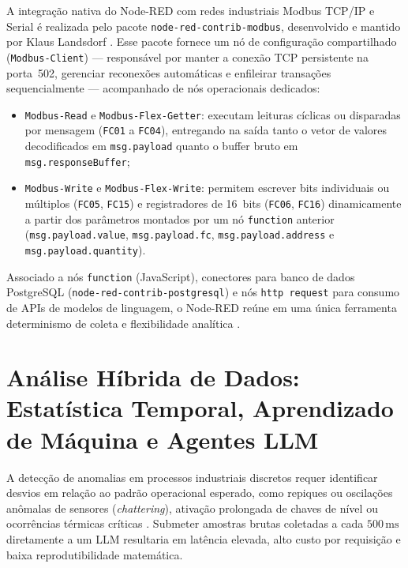 A integração nativa do Node-RED com redes industriais Modbus TCP/IP e Serial é realizada pelo pacote \texttt{node-red-contrib-modbus}, desenvolvido e mantido por Klaus Landsdorf \cite{nodered_contrib_modbus}. Esse pacote fornece um nó de configuração compartilhado (\texttt{Modbus-Client}) --- responsável por manter a conexão TCP persistente na porta~502, gerenciar reconexões automáticas e enfileirar transações sequencialmente --- acompanhado de nós operacionais dedicados:
\begin{itemize}
  \item \texttt{Modbus-Read} e \texttt{Modbus-Flex-Getter}: executam leituras cíclicas ou disparadas por mensagem (\texttt{FC01} a \texttt{FC04}), entregando na saída tanto o vetor de valores decodificados em \texttt{msg.payload} quanto o buffer bruto em \texttt{msg.responseBuffer};
  \item \texttt{Modbus-Write} e \texttt{Modbus-Flex-Write}: permitem escrever bits individuais ou múltiplos (\texttt{FC05}, \texttt{FC15}) e registradores de 16~bits (\texttt{FC06}, \texttt{FC16}) dinamicamente a partir dos parâmetros montados por um nó \texttt{function} anterior (\texttt{msg.payload.value}, \texttt{msg.payload.fc}, \texttt{msg.payload.address} e \texttt{msg.payload.quantity}).
\end{itemize}

Associado a nós \texttt{function} (JavaScript), conectores para banco de dados PostgreSQL (\texttt{node-red-contrib-postgresql}) e nós \texttt{http request} para consumo de APIs de modelos de linguagem, o Node-RED reúne em uma única ferramenta determinismo de coleta e flexibilidade analítica \cite{nodered_docs, postgresql_docs}.

\section{Análise Híbrida de Dados: Estatística Temporal, Aprendizado de Máquina e Agentes LLM}
\label{sec:fund_ia}

A detecção de anomalias em processos industriais discretos requer identificar desvios em relação ao padrão operacional esperado, como repiques ou oscilações anômalas de sensores (\textit{chattering}), ativação prolongada de chaves de nível ou ocorrências térmicas críticas \cite{chandola_2009}. Submeter amostras brutas coletadas a cada $500\,\text{ms}$ diretamente a um LLM resultaria em latência elevada, alto custo por requisição e baixa reprodutibilidade matemática.

